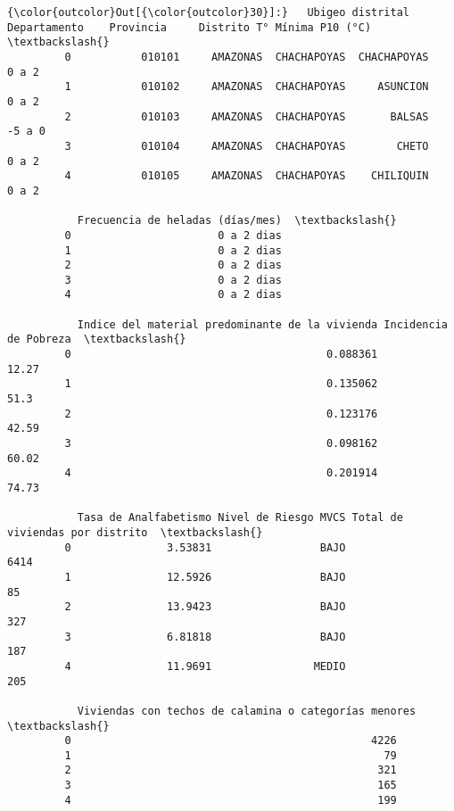 \documentclass[11pt]{article}
\begin{document}
\begin{Verbatim}[commandchars=\\\{\}]
{\color{outcolor}Out[{\color{outcolor}30}]:}   Ubigeo distrital Departamento    Provincia     Distrito T° Mínima P10 (°C)  \textbackslash{}
         0           010101     AMAZONAS  CHACHAPOYAS  CHACHAPOYAS              0 a 2   
         1           010102     AMAZONAS  CHACHAPOYAS     ASUNCION              0 a 2   
         2           010103     AMAZONAS  CHACHAPOYAS       BALSAS             -5 a 0   
         3           010104     AMAZONAS  CHACHAPOYAS        CHETO              0 a 2   
         4           010105     AMAZONAS  CHACHAPOYAS    CHILIQUIN              0 a 2   
         
           Frecuencia de heladas (días/mes)  \textbackslash{}
         0                       0 a 2 dias   
         1                       0 a 2 dias   
         2                       0 a 2 dias   
         3                       0 a 2 dias   
         4                       0 a 2 dias   
         
           Indice del material predominante de la vivienda Incidencia de Pobreza  \textbackslash{}
         0                                        0.088361                 12.27   
         1                                        0.135062                  51.3   
         2                                        0.123176                 42.59   
         3                                        0.098162                 60.02   
         4                                        0.201914                 74.73   
         
           Tasa de Analfabetismo Nivel de Riesgo MVCS Total de viviendas por distrito  \textbackslash{}
         0               3.53831                 BAJO                            6414   
         1               12.5926                 BAJO                              85   
         2               13.9423                 BAJO                             327   
         3               6.81818                 BAJO                             187   
         4               11.9691                MEDIO                             205   
         
           Viviendas con techos de calamina o categorías menores  \textbackslash{}
         0                                               4226      
         1                                                 79      
         2                                                321      
         3                                                165      
         4                                                199      
         

\end{Verbatim}
\end{document}
